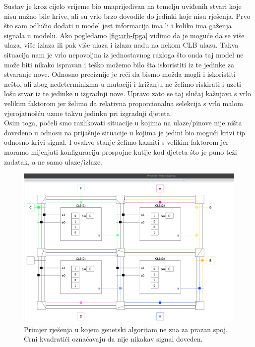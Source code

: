 \documentclass[times, utf8, zavrsni]{fer}
\begin{document}
	
	
	Sustav je kroz cijelo vrijeme bio unaprijeđivan na temelju uviđenih stvari koje nisu nužno bile krive, ali su vrlo brzo dovodile do jedinki koje nisu rješenja. Prvo što sam odlučio dodati u model jest informacija ima li i koliko ima gaženja signala u modelu. Ako pogledamo \ref{fig:arh-fpga} vidimo da je moguće da se više ulaza, više izlaza ili pak više ulaza i izlaza nađu na nekom CLB ulazu. Takva situacija nam je vrlo nepovoljna iz jednostavnog razloga što onda taj model ne može biti nikako ispravan i teško možemo bilo šta iskoristiti iz te jedinke za stvaranje nove. Odnosno preciznije je reći da bismo možda mogli i iskoristiti nešto, ali zbog nedeterminizma u mutaciji i križanju ne želimo riskirati i uzeti lošu stvar iz te jedinke u izgradnji nove. Upravo zato se taj slučaj kažnjava s vrlo velikim faktorom jer želimo da relativna proporcionalna selekcija s vrlo malom vjerojatnošću uzme takvu jedinku pri izgradnji djeteta. \\ 
	Osim toga, počeli smo razlikovati situacije u kojima na ulaze/pinove nije ništa dovedeno u odnosu na prijašnje situacije u kojima je jedini bio mogući krivi tip odnosno krivi signal. I ovakvo stanje želimo kazniti s velikim faktorom jer moramo mijenjati konfiguraciju prospojne kutije kod djeteta što je puno teži zadatak, a ne samo ulaze/izlaze. 
	
	
	\begin{figure}[H]
		\centering
		\includegraphics[width=18cm]{slike/blackLabel.png}
		\caption{Primjer rješenja u kojem genetski algoritam ne zna za prazan spoj. Crni kvadratići označavaju da nije nikakav signal doveden. }
		\label{fig:black-label}
	\end{figure} 
	
\end{document}
